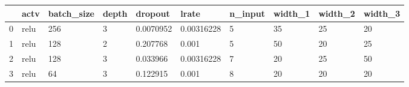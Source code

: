 \begin{tabular}{llllllllll}
\toprule
{} &  actv & batch\_size & depth &    dropout &       lrate & n\_input & width\_1 & width\_2 & width\_3 \\
\midrule
0 &  relu &        256 &     3 &  0.0070952 &  0.00316228 &       5 &      35 &      25 &      20 \\
1 &  relu &        128 &     2 &   0.207768 &       0.001 &       5 &      50 &      20 &      25 \\
2 &  relu &        128 &     3 &   0.033966 &  0.00316228 &       7 &      20 &      25 &      50 \\
3 &  relu &         64 &     3 &   0.122915 &       0.001 &       8 &      20 &      20 &      20 \\
\bottomrule
\end{tabular}
